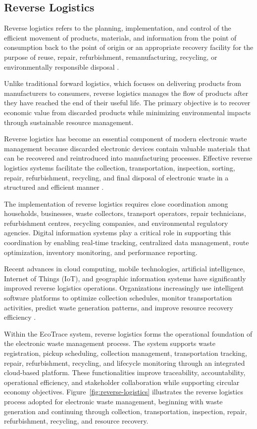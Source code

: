 \subsection{Reverse Logistics}

Reverse logistics refers to the planning, implementation, and control of the
efficient movement of products, materials, and information from the point of
consumption back to the point of origin or an appropriate recovery facility for the
purpose of reuse, repair, refurbishment, remanufacturing, recycling, or
environmentally responsible disposal \citep{agrawal2015,rogers1999}.

Unlike traditional forward logistics, which focuses on delivering products from
manufacturers to consumers, reverse logistics manages the flow of products after
they have reached the end of their useful life. The primary objective is to recover
economic value from discarded products while minimizing environmental impacts
through sustainable resource management.

Reverse logistics has become an essential component of modern electronic
waste management because discarded electronic devices contain valuable
materials that can be recovered and reintroduced into manufacturing processes.
Effective reverse logistics systems facilitate the collection, transportation,
inspection, sorting, repair, refurbishment, recycling, and final disposal of
electronic waste in a structured and efficient manner \citep{govindan2015}.

The implementation of reverse logistics requires close coordination among
households, businesses, waste collectors, transport operators, repair technicians,
refurbishment centres, recycling companies, and environmental regulatory
agencies. Digital information systems play a critical role in supporting this
coordination by enabling real-time tracking, centralized data management, route
optimization, inventory monitoring, and performance reporting.

Recent advances in cloud computing, mobile technologies, artificial intelligence,
Internet of Things (IoT), and geographic information systems have significantly
improved reverse logistics operations. Organizations increasingly use intelligent
software platforms to optimize collection schedules, monitor transportation
activities, predict waste generation patterns, and improve resource recovery
efficiency \citep{kazancoglu2021}.

Within the EcoTrace system, reverse logistics forms the operational foundation
of the electronic waste management process. The system supports waste
registration, pickup scheduling, collection management, transportation tracking,
repair, refurbishment, recycling, and lifecycle monitoring through an integrated
cloud-based platform. These functionalities improve traceability, accountability,
operational efficiency, and stakeholder collaboration while supporting circular
economy objectives. Figure~\ref{fig:reverse-logistics} illustrates the reverse
logistics process adopted for electronic waste management, beginning with waste
generation and continuing through collection, transportation, inspection, repair,
refurbishment, recycling, and resource recovery.

